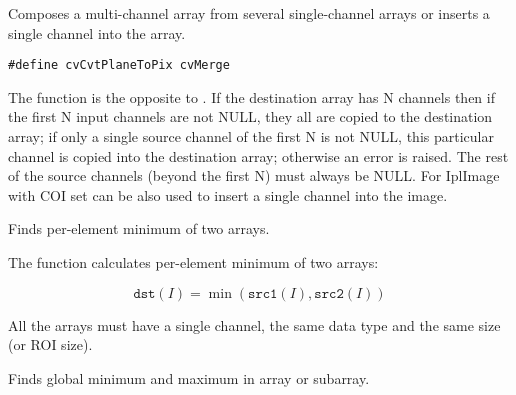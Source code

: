 Composes a multi-channel array from several single-channel arrays or inserts a single channel into the array.

\ifC
\begin{lstlisting}
#define cvCvtPlaneToPix cvMerge
\end{lstlisting}
\fi
{}

\begin{description}
\end{description}

The function is the opposite to . If the destination array has N channels then if the first N input channels are not NULL, they all are copied to the destination array; if only a single source channel of the first N is not NULL, this particular channel is copied into the destination array; otherwise an error is raised. The rest of the source channels (beyond the first N) must always be NULL. For IplImage  with COI set can be also used to insert a single channel into the image.

Finds per-element minimum of two arrays.


\begin{description}
\end{description}


The function calculates per-element minimum of two arrays:

\[
\texttt{dst}(I)=\min(\texttt{src1}(I),\texttt{src2}(I))
\]

All the arrays must have a single channel, the same data type and the same size (or ROI size).


Finds global minimum and maximum in array or subarray.


